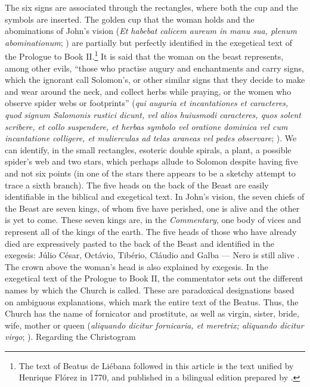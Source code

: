 \begin{paper}
The six signs are associated through the rectangles, where both the cup
and the symbols are inserted. The golden cup that the woman holds and
the abominations of John's vision (\emph{Et habebat calicem aureum in
manu sua, plenum abominationum}; \citealt[566]{gonzalez_echegaray_obras_1995})
are partially but perfectly identified in the exegetical text of the
Prologue to Book II.\footnote{The text of Beatus de Liébana followed in
  this article is the text unified by Henrique Flórez in 1770, and
  published in a bilingual edition prepared by \citet{gonzalez_echegaray_obras_1995}.} It is said that the woman on the beast represents, among
other evils, ``those who practise augury and enchantments and carry
signs, which the ignorant call Solomon's, or other similar signs that
they decide to make and wear around the neck, and collect herbs while
praying, or the women who observe spider webs or footprints'' (\emph{qui
auguria et incantationes et caracteres, quod signum Salomonis rustici
dicunt, vel alios huiusmodi caracteres, quos solent scribere, et collo
suspendere, et herbas symbolo vel oratione dominica vel cum incantatione
colligere, et mulierculas ad telas araneas vel pedes observare}; \citealt[162]{gonzalez_echegaray_obras_1995}). We can identify, in the small
rectangles, esoteric double spirals, a plant, a possible spider's web
and two stars, which perhaps allude to Solomon despite having five and
not six points (in one of the stars there appears to be a sketchy
attempt to trace a sixth branch). The five heads on the back of the
Beast are easily identifiable in the biblical and exegetical text. In
John's vision, the seven chiefs of the Beast are seven kings, of whom
five have perished, one is alive and the other is yet to come. These
seven kings are, in the \emph{Commentary}, one body of vices and
represent all of the kings of the earth. The five heads of those who
have already died are expressively pasted to the back of the Beast and
identified in the exegesis: Júlio César, Octávio, Tibério, Cláudio and
Galba –– Nero is still alive \citep[574]{gonzalez_echegaray_obras_1995}. The
crown above the woman's head is also explained by exegesis. In the
exegetical text of the Prologue to Book II, the commentator sets out the
different names by which the Church is called. These are paradoxical
designations based on ambiguous explanations, which mark the entire text
of the Beatus. Thus, the Church has the name of fornicator and
prostitute, as well as virgin, sister, bride, wife, mother or queen
(\emph{aliquando dicitur fornicaria, et meretrix; aliquando dicitur
virgo}; \citealt[164]{gonzalez_echegaray_obras_1995}). Regarding the Christogram

\end{paper}

